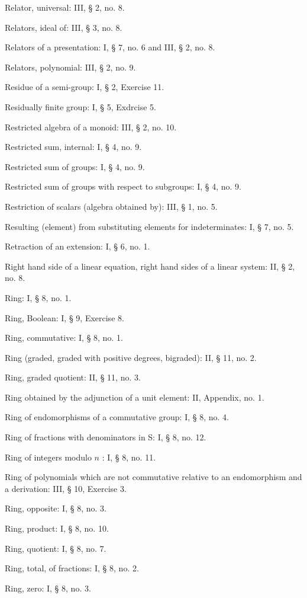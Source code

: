 Relator, universal: III, § 2, no. 8.

Relators, ideal of: III, § 3, no. 8.

Relators of a presentation: I, § 7, no. 6 and III, § 2, no. 8.

Relators, polynomial: III, § 2, no. 9.

Residue of a semi-group: I, § 2, Exercise 11.

Residually finite group: I, § 5, Exdrcise 5.

Restricted algebra of a monoid: III, § 2, no. 10.

Restricted sum, internal: I, § 4, no. 9.

Restricted sum of groups: I, § 4, no. 9.

Restricted sum of groups with respect to subgroups: I, § 4, no. 9.

Restriction of scalars (algebra obtained by): III, § 1, no. 5.

Resulting (element) from substituting elements for indeterminates: I, § 7, no. 5.

Retraction of an extension: I, § 6, no. 1.

Right hand side of a linear equation, right hand sides of a linear system: II, § 2, no. 8.

Ring: I, § 8, no. 1.

Ring, Boolean: I, § 9, Exercise 8.

Ring, commutative: I, § 8, no. 1.

Ring (graded, graded with positive degrees, bigraded): II, § 11, no. 2.

Ring, graded quotient: II, § 11, no. 3.

Ring obtained by the adjunction of a unit element: II, Appendix, no. 1.

Ring of endomorphisms of a commutative group: I, § 8, no. 4.

Ring of fractions with denominators in S: I, § 8, no. 12.

Ring of integers modulo \(n\) : I, § 8, no. 11.

Ring of polynomials which are not commutative relative to an endomorphism and a derivation: III, § 10, Exercise 3.

Ring, opposite: I, § 8, no. 3.

Ring, product: I, § 8, no. 10.

Ring, quotient: I, § 8, no. 7.

Ring, total, of fractions: I, § 8, no. 2.

Ring, zero: I, § 8, no. 3.

